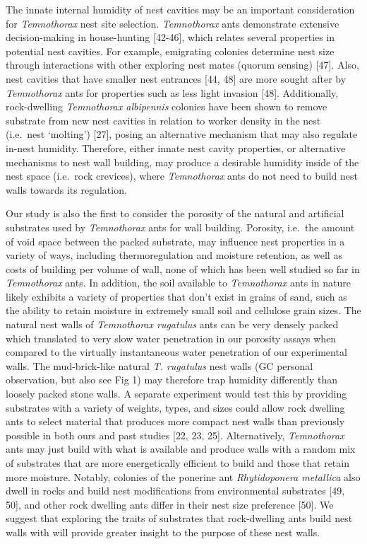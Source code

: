 \documentclass[3p]{elsarticle} %
\begin{document}
The innate internal humidity of nest cavities may be an important
consideration for \emph{Temnothorax} nest site selection.
\emph{Temnothorax} ants demonstrate extensive decision-making in
house-hunting {[}42-46{]}, which relates several properties in potential
nest cavities. For example, emigrating colonies determine nest size
through interactions with other exploring nest mates (quorum sensing)
{[}47{]}. Also, nest cavities that have smaller nest entrances {[}44,
48{]} are more sought after by \emph{Temnothorax} ants for properties
such as less light invasion {[}48{]}. Additionally, rock-dwelling
\emph{Temnothorax albipennis} colonies have been shown to remove
substrate from new nest cavities in relation to worker density in the
nest (i.e.~nest `molting') {[}27{]}, posing an alternative mechanism
that may also regulate in-nest humidity. Therefore, either innate nest
cavity properties, or alternative mechanisms to nest wall building, may
produce a desirable humidity inside of the nest space (i.e.~rock
crevices), where \emph{Temnothorax} ants do not need to build nest walls
towards its regulation.

Our study is also the first to consider the porosity of the natural and
artificial substrates used by \emph{Temnothorax} ants for wall building.
Porosity, i.e.~the amount of void space between the packed substrate,
may influence nest properties in a variety of ways, including
thermoregulation and moisture retention, as well as costs of building
per volume of wall, none of which has been well studied so far in
\emph{Temnothorax} ants. In addition, the soil available to
\emph{Temnothorax} ants in nature likely exhibits a variety of
properties that don't exist in grains of sand, such as the ability to
retain moisture in extremely small soil and cellulose grain sizes. The
natural nest walls of \emph{Temnothorax rugatulus} ants can be very
densely packed which translated to very slow water penetration in our
porosity assays when compared to the virtually instantaneous water
penetration of our experimental walls. The mud-brick-like natural
\emph{T. rugatulus} nest walls (GC personal observation, but also see
Fig 1) may therefore trap humidity differently than loosely packed stone
walls. A separate experiment would test this by providing substrates
with a variety of weights, types, and sizes could allow rock dwelling
ants to select material that produces more compact nest walls than
previously possible in both ours and past studies {[}22, 23, 25{]}.
Alternatively, \emph{Temnothorax} ants may just build with what is
available and produce walls with a random mix of substrates that are
more energetically efficient to build and those that retain more
moisture. Notably, colonies of the ponerine ant \emph{Rhytidoponera
metallica} also dwell in rocks and build nest modifications from
environmental substrates {[}49, 50{]}, and other rock dwelling ants
differ in their nest size preference {[}50{]}. We suggest that exploring
the traits of substrates that rock-dwelling ants build nest walls with
will provide greater insight to the purpose of these nest walls.
\end{document}
